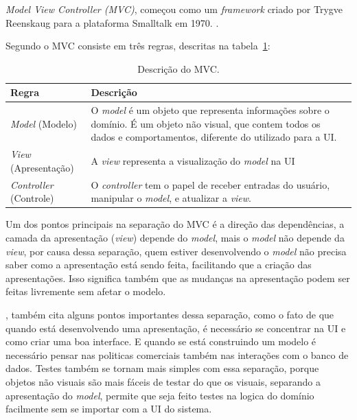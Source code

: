 \textit{Model View Controller (MVC)}, começou como um \textit{framework} criado por Trygve Reenskaug para a plataforma Smalltalk em 1970. \cite[p.~321]{martin_fowler_patterns}.

Segundo  o \ac{MVC} consiste em três regras, descritas na tabela~\ref{tbl:mvc}:

\begin{table}[htp]
    \begin{center}
        \begin{tabular}{|l|p{10cm}|}
            \hline \textbf{Regra} & \textbf{Descrição} \\
            \hline \textit{Model} (Modelo) & 
            O \textit{model} é um objeto que representa informações sobre o domínio. É um objeto não visual, que contem todos os dados e comportamentos, diferente do utilizado para a UI. \\
            \hline \textit{View} (Apresentação) & 
            A \textit{view} representa a visualização do \textit{model} na \ac{UI} \\
            \hline \textit{Controller} (Controle) & 
            O \textit{controller} tem o papel de receber entradas do usuário, manipular o \textit{model}, e atualizar a \textit{view}. \\
            \hline
        \end{tabular}
        \caption{Descrição do \ac{MVC}.}
        \label{tbl:mvc}
    \end{center}
\end{table}

Um dos pontos principais na separação do \ac{MVC} é a direção das dependências, a camada da apresentação (\textit{view}) depende do \textit{model}, mais o \textit{model} não depende da \textit{view}, por causa dessa separação, quem estiver desenvolvendo o \textit{model} não precisa saber como a apresentação está sendo feita, facilitando que a criação das apresentações. Isso significa também que as mudanças na apresentação podem ser feitas livremente sem afetar o modelo.

, também cita alguns pontos importantes dessa separação, como o fato de que quando está desenvolvendo uma apresentação, é necessário se concentrar na \ac{UI} e como criar uma boa interface. E quando se está construindo um modelo é necessário pensar nas politicas comerciais também nas interações com o banco de dados. Testes também se tornam mais simples com essa separação, porque objetos não visuais são mais fáceis de testar do que os visuais, separando a apresentação do \textit{model}, permite que seja feito testes na logica do domínio facilmente sem se importar com a \ac{UI} do sistema.
